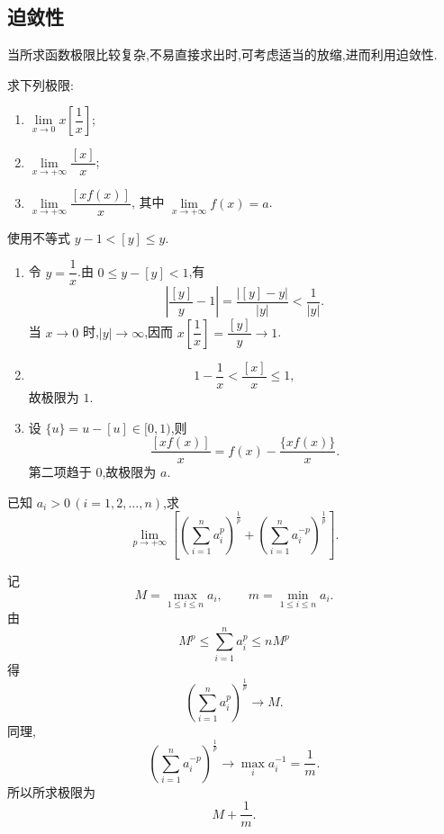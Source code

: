 \subsection{迫敛性}

当所求函数极限比较复杂,不易直接求出时,可考虑适当的放缩,进而利用迫敛性.

\begin{example}
    求下列极限:
    \begin{enumerate}
        \item $\displaystyle\lim\limits_{x\to0}x\left[\dfrac{1}{x}\right]$;
        \item $\displaystyle\lim\limits_{x\to+\infty}\dfrac{[x]}{x}$;
        \item $\displaystyle\lim\limits_{x\to+\infty}\dfrac{[xf(x)]}{x}$,
              其中 $\displaystyle\lim\limits_{x\to+\infty}f(x)=a$.
    \end{enumerate}
\end{example}
\exampleblank

\begin{solution}
    使用不等式 $y-1<[y]\leq y$.
    \begin{enumerate}
        \item 令 $y=\dfrac{1}{x}$.由 $0\leq y-[y]<1$,有
              \[
                  \left|\dfrac{[y]}{y}-1\right|
                  =\dfrac{|[y]-y|}{|y|}<\dfrac{1}{|y|}.
              \]
              当 $x\to0$ 时,$|y|\to\infty$,因而
              $x\left[\dfrac{1}{x}\right]=\dfrac{[y]}{y}\to1$.
        \item
              \[
                  1-\dfrac{1}{x}<\dfrac{[x]}{x}\leq1,
              \]
              故极限为 $1$.
        \item 设 $\{u\}=u-[u]\in\lbrack0,1)$,则
              \[
                  \dfrac{[xf(x)]}{x}=f(x)-\dfrac{\{xf(x)\}}{x}.
              \]
              第二项趋于 $0$,故极限为 $a$.
    \end{enumerate}
\end{solution}

\begin{example}
    已知 $a_i>0\,(i=1,2,\ldots,n)$,求
    \[
        \displaystyle\lim\limits_{p\to+\infty}
        \left[
            \left(\sum\limits_{i=1}^n a_i^p\right)^{\frac{1}{p}}
            +
            \left(\sum\limits_{i=1}^n a_i^{-p}\right)^{\frac{1}{p}}
            \right].
    \]
\end{example}
\exampleblank

\begin{solution}
    记
    \[
        M=\max\limits_{1\leq i\leq n}a_i,
        \qquad
        m=\min\limits_{1\leq i\leq n}a_i.
    \]
    由
    \[
        M^p\leq\sum\limits_{i=1}^{n}a_i^p\leq nM^p
    \]
    得
    \[
        \left(\sum\limits_{i=1}^{n}a_i^p\right)^{\frac{1}{p}}\longrightarrow M.
    \]
    同理,
    \[
        \left(\sum\limits_{i=1}^{n}a_i^{-p}\right)^{\frac{1}{p}}
        \longrightarrow\max\limits_i a_i^{-1}=\dfrac{1}{m}.
    \]
    所以所求极限为
    \[
        M+\dfrac{1}{m}.
    \]
\end{solution}



